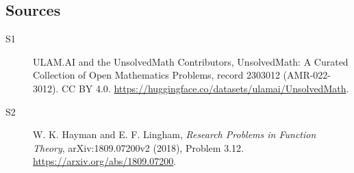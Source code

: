 \documentclass[11pt]{article}
\begin{document}
\subsection{Sources}
\begin{description}
\item[\hypertarget{source:2303012:1}{S1}] ULAM.AI and the UnsolvedMath Contributors, UnsolvedMath: A Curated Collection of Open Mathematics Problems, record 2303012 (AMR-022-3012). CC BY 4.0. \url{https://huggingface.co/datasets/ulamai/UnsolvedMath}.
\item[\hypertarget{source:2303012:2}{S2}] W. K. Hayman and E. F. Lingham, \emph{Research Problems in Function Theory}, arXiv:1809.07200v2 (2018), Problem 3.12. \url{https://arxiv.org/abs/1809.07200}.
\end{description}
\label{end:2303012}
\end{document}
